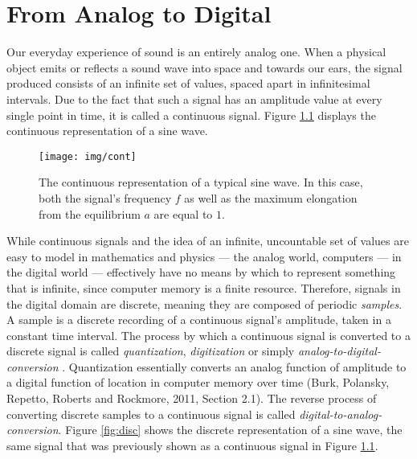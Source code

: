 \chapter{From Analog to Digital}

Our everyday experience of sound is an entirely analog one. When a physical     object emits or reflects a sound wave into space and towards our ears, the signal produced consists of an infinite set of values, spaced apart in infinitesimal intervals. Due to the fact that such a signal has an amplitude value at every single point in time, it is called a continuous signal.  Figure \ref{fig:cont} displays the continuous representation of a sine wave.

\begin{figure}[h!]

  \centering

  \texttt{[image: img/cont]}

  \caption{The continuous representation of a typical sine wave. In this case, both the signal's frequency $f$ as well as the maximum elongation from the equilibrium $a$ are equal to $1$. }

  \label{fig:cont}

\end{figure}

\pagebreak

While continuous signals and the idea of an infinite, uncountable set of values are easy to model in mathematics and physics --- the analog world, computers --- in the digital world --- effectively have no means by which to represent something that is infinite, since computer memory is a finite resource. Therefore, signals in the digital domain are discrete, meaning they are composed of periodic \emph{samples}. A sample is a discrete recording of a continuous signal's amplitude, taken in a constant time interval. The process by which a continuous signal is converted to a discrete signal is called \emph{quantization}, \emph{digitization} or simply \emph{analog-to-digital-conversion} . Quantization essentially converts an analog function of amplitude to a digital function of location in computer memory over time (Burk, Polansky, Repetto, Roberts and Rockmore, 2011, Section 2.1). The reverse process of converting discrete samples to a continuous signal is called \emph{digital-to-analog-conversion}. Figure \ref{fig:disc} shows the discrete representation of a sine wave, the same signal that was previously shown as a continuous signal in Figure \ref{fig:cont}. 

